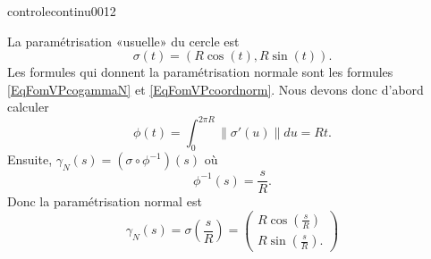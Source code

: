 \begin{corrige}{controlecontinu0012}

    La paramétrisation «usuelle»  du cercle est 
    \begin{equation}
        \sigma(t)=(R\cos(t),R\sin(t)).
    \end{equation}
    Les formules qui donnent la paramétrisation normale sont les formules \eqref{EqFomVPcogammaN} et \eqref{EqFomVPcoordnorm}. Nous devons donc  d'abord calculer
    \begin{equation}
        \phi(t)=\int_0^{2\pi R}\| \sigma'(u) \|du=Rt.
    \end{equation}
    Ensuite, \( \gamma_N(s)=(\sigma\circ\phi^{-1})(s)\) où 
    \begin{equation}
        \phi^{-1}(s)=\frac{ s }{ R }.       
    \end{equation}
    Donc la paramétrisation normal est
    \begin{equation}
        \gamma_N(s)=\sigma\left( \frac{ s }{ R } \right)=\begin{pmatrix}
            R\cos\left( \frac{ s }{ R } \right)    \\ 
            R\sin\left( \frac{ s }{ R } \right).    
        \end{pmatrix}
    \end{equation}

\end{corrige}
